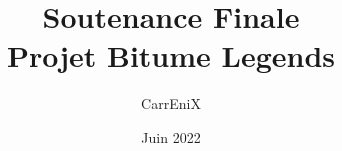 \documentclass[11pt,a4paper]{article}
\begin{document}
\title{Soutenance Finale \\ {\large Projet Bitume Legends}}
\author{CarrEniX}
\date{Juin 2022}
\maketitle


\tableofcontents
\clearpage
\end{document}

